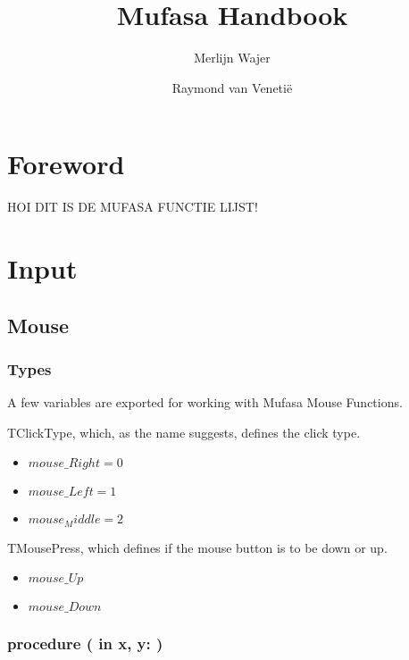 \documentclass[a4paper]{report}
\begin{document}
\title{Mufasa Handbook}
\author{Merlijn Wajer \and Raymond van Veneti\"{e}}


\maketitle
\tableofcontents

\chapter{Foreword}

HOI DIT IS DE MUFASA FUNCTIE LIJST!

\chapter{Input}

\section{Mouse}

\subsection{Types}

A few variables are exported for working with Mufasa Mouse Functions.

TClickType, which, as the name suggests, defines the click type.
\begin{itemize}
	\item $mouse\_Right = 0$ 
	\item $mouse\_Left = 1$
	\item $mouse_Middle = 2$
\end{itemize}

TMousePress, which defines if the mouse button is to be down or up.
\begin{itemize}
	\item $mouse\_Up$
	\item $mouse\_Down$
\end{itemize}


\subsection{\textbf{procedure} {\color{blue}{MoveMouse}}({\color{typeRed}
{in x, y: }}{\color{typeGreen}{Integer}})}
\end{document}
